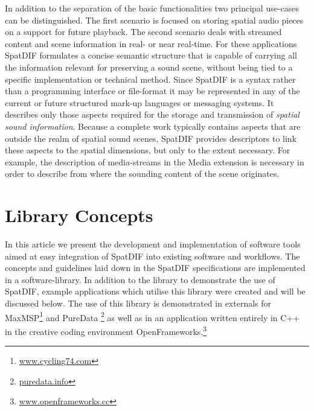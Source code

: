 \documentclass{article}
\begin{document}
In addition to the separation of the basic functionalities two principal use-cases can be distinguished.
The first scenario is focused on storing spatial audio pieces on a support for future playback. 
The second scenario deals with streamed content and scene information in real- or near real-time.
For these applications SpatDIF formulates a concise semantic structure that is capable of carrying all the information relevant for preserving a sound scene, without being tied to a specific implementation or technical method.
Since SpatDIF is a syntax rather than a programming interface or file-format it may be represented in any of the current or future structured mark-up languages or messaging systems.
It describes only those aspects required for the storage and transmission of \emph{spatial sound information}.
Because a complete work typically contains aspects that are outside the realm of spatial sound scenes, SpatDIF provides descriptors to link these aspects to the spatial dimensions, but only to the extent necessary.
For example, the description of media-streams in the Media extension is necessary in order to describe from where the sounding content of the scene originates.

\section{Library Concepts}\label{sec:libspatdif_concepts}


In this article we present the development and implementation of software tools aimed at easy integration of SpatDIF into existing software and workflows.
The concepts and guidelines laid down in the SpatDIF specifications are implemented in a software-library.
In addition to the library to demonstrate the use of SpatDIF, example applications which utilise this library were created and will be discussed below.
The use of this library is demonstrated in externals for MaxMSP\footnote{\href{http://www.cycling74.com}{www.cycling74.com}} and PureData \footnote{\href{http://puredata.info}{puredata.info}} as well as in an application written entirely in C++ in the creative coding environment OpenFrameworks.\footnote{\href{http://www.openframeworks.cc}{www.openframeworks.cc}}
\end{document}
